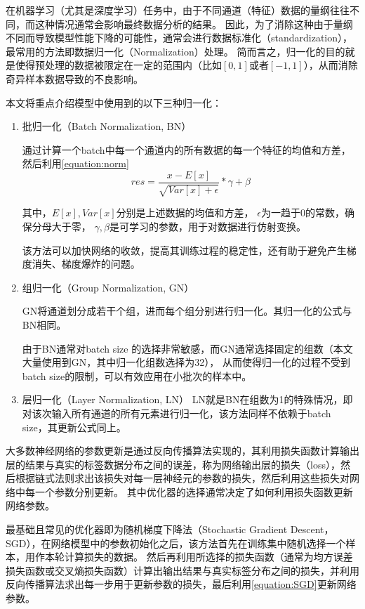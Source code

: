 在机器学习（尤其是深度学习）任务中，由于不同通道（特征）数据的量纲往往不同，而这种情况通常会影响最终数据分析的结果。
因此，为了消除这种由于量纲不同而导致模型性能下降的可能性，通常会进行数据标准化（standardization），最常用的方法即数据归一化（Normalization）处理。
简而言之，归一化的目的就是使得预处理的数据被限定在一定的范围内（比如$[0,1]$或者$[-1,1]$），从而消除奇异样本数据导致的不良影响。

本文将重点介绍模型中使用到的以下三种归一化：
\begin{enumerate}
  \item 批归一化（Batch Normalization, BN）

  
  通过计算一个batch中每一个通道内的所有数据的每一个特征的均值和方差，然后利用\cref{equation:norm}
\begin{equation}
  \label{equation:norm}
  res = \frac{x - E\left[ x\right]}{\sqrt{Var\left[ x\right] + \epsilon}} * \gamma + \beta
\end{equation}

其中，$E\left[ x\right], Var\left[ x\right]$分别是上述数据的均值和方差， $\epsilon$为一趋于0的常数，确保分母大于零，
$\gamma, \beta$是可学习的参数，用于对数据进行仿射变换。

该方法可以加快网络的收敛，提高其训练过程的稳定性，还有助于避免产生梯度消失、梯度爆炸的问题。

  \item 组归一化（Group Normalization, GN）
  
  GN将通道划分成若干个组，进而每个组分别进行归一化。其归一化的公式与BN相同。
  
  由于BN通常对batch size 的选择非常敏感，而GN通常选择固定的组数（本文大量使用到GN，其中归一化组数选择为32），
  从而使得归一化的过程不受到batch size的限制，可以有效应用在小批次的样本中。

  \item 层归一化（Layer Normalization, LN）
  LN就是BN在组数为1的特殊情况，即对该次输入所有通道的所有元素进行归一化，该方法同样不依赖于batch size，其更新公式同上。
\end{enumerate}


大多数神经网络的参数更新是通过反向传播算法实现的，其利用损失函数计算输出层的结果与真实的标签数据分布之间的误差，称为网络输出层的损失（loss），然后根据链式法则求出该损失对每一层神经元的参数的损失，然后利用这些损失对网络中每一个参数分别更新。
其中优化器的选择通常决定了如何利用损失函数更新网络参数。

最基础且常见的优化器即为随机梯度下降法（Stochastic Gradient Descent，SGD），在网络模型中的参数初始化之后，该方法首先在训练集中随机选择一个样本，用作本轮计算损失的数据。
然后再利用所选择的损失函数（通常为均方误差损失函数或交叉熵损失函数）计算出输出结果与真实标签分布之间的损失，并利用反向传播算法求出每一步用于更新参数的损失，最后利用\cref{equation:SGD}更新网络参数。

